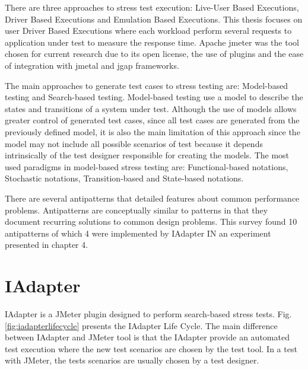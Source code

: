 \documentclass[espaco=umemeio,chapter=TITLE,twoside,openright]{abnt}
\begin{document}
There are three approaches to stress test execution: Live-User Based Executions, Driver Based Executions and Emulation Based Executions. This thesis focuses on user Driver Based Executions where each workload perform several requests to application under test to measure the response time. Apache jmeter was the tool chosen for current research due to its open license, the use of plugins and the ease of integration with jmetal and jgap frameworks.

The main approaches to generate test cases to stress testing are: Model-based testing and Search-based testing. Model-based testing use a model to describe the states and transitions of a system under test. Although the use of models allows greater control of generated test cases, since all test cases are generated from the previously defined model, it is also the main limitation of this approach since the model may not include all possible scenarios of test because it depends intrinsically of the test designer responsible for creating the models. The most used paradigms in model-based stress testing are:  Functional-based notations, Stochastic notations, Transition-based and State-based notations. 

There are several antipatterns that detailed features about common performance problems. Antipatterns
are conceptually similar to patterns in that they document recurring solutions to common design problems. This survey found 10 antipatterns of which 4 were  implemented by IAdapter IN an experiment presented in chapter 4.



\chapter{IAdapter }



IAdapter is a JMeter plugin designed to perform search-based stress tests. Fig. \ref{fig:iadapterlifecycle} presents the IAdapter Life Cycle. The main difference between IAdapter and JMeter tool is that the IAdapter provide an automated test execution where the new test scenarios are chosen by the test tool.  In a test with JMeter, the tests scenarios are usually chosen by a test designer.
\end{document}
